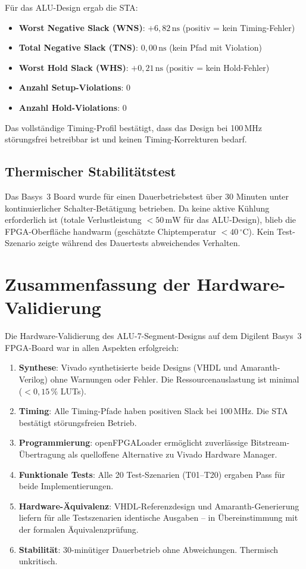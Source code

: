 ﻿\documentclass[12pt,a4paper]{report}
\begin{document}
Für das ALU-Design ergab die STA:
\begin{itemize}
  \item \textbf{Worst Negative Slack (WNS)}: $+6{,}82\,\text{ns}$ (positiv = kein Timing-Fehler)
  \item \textbf{Total Negative Slack (TNS)}: $0{,}00\,\text{ns}$ (kein Pfad mit Violation)
  \item \textbf{Worst Hold Slack (WHS)}: $+0{,}21\,\text{ns}$ (positiv = kein Hold-Fehler)
  \item \textbf{Anzahl Setup-Violations}: 0
  \item \textbf{Anzahl Hold-Violations}: 0
\end{itemize}

Das vollständige Timing-Profil bestätigt, dass das Design bei 100\,MHz störungsfrei betreibbar ist und keinen Timing-Korrekturen bedarf.

\subsection{Thermischer Stabilitätstest}
\label{subsec:thermisch}

Das Basys~3 Board wurde für einen Dauerbetriebstest über 30 Minuten unter kontinuierlicher Schalter-Betätigung betrieben. Da keine aktive Kühlung erforderlich ist (totale Verlustleistung $< 50\,\text{mW}$ für das ALU-Design), blieb die FPGA-Oberfläche handwarm (geschätzte Chiptemperatur $< 40\,^{\circ}\text{C}$). Kein Test-Szenario zeigte während des Dauertests abweichendes Verhalten.

\section{Zusammenfassung der Hardware-Validierung}
\label{sec:hw_zusammenfassung}

Die Hardware-Validierung des ALU-7-Segment-Designs auf dem Digilent Basys~3 FPGA-Board war in allen Aspekten erfolgreich:

\begin{enumerate}
  \item \textbf{Synthese}: Vivado synthetisierte beide Designs (VHDL und Amaranth-Verilog) ohne Warnungen oder Fehler. Die Ressourcenauslastung ist minimal ($< 0{,}15\,\%$ LUTs).
  \item \textbf{Timing}: Alle Timing-Pfade haben positiven Slack bei 100\,MHz. Die STA bestätigt störungsfreien Betrieb.
  \item \textbf{Programmierung}: openFPGALoader ermöglicht zuverlässige Bitstream-Übertra\-gung als quelloffene Alternative zu Vivado Hardware Manager.
  \item \textbf{Funktionale Tests}: Alle 20 Test-Szenarien (T01--T20) ergaben Pass für beide Implementierungen.
  \item \textbf{Hardware-Äquivalenz}: VHDL-Referenzdesign und Amaranth-Generierung liefern für alle Testszenarien identische Ausgaben -- in Übereinstimmung mit der formalen Äquivalenzprüfung.
  \item \textbf{Stabilität}: 30-minütiger Dauerbetrieb ohne Abweichungen. Thermisch unkritisch.
\end{enumerate}
\end{document}
